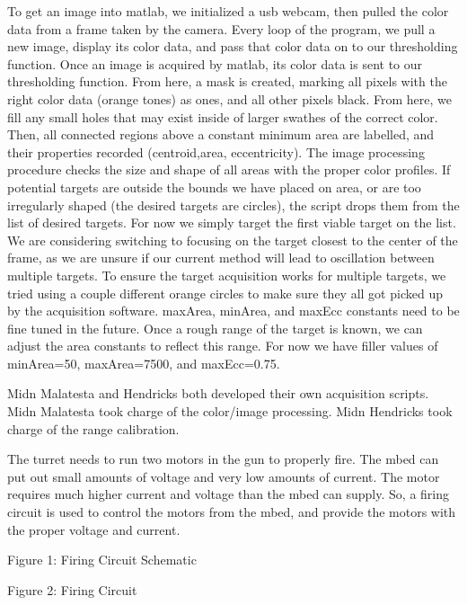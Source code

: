 To get an image into matlab, we initialized a usb webcam, then pulled the color data from a frame taken by the camera. Every loop of the program, we pull a new image, display its color data, and pass that color data on to our thresholding function.
Once an image is acquired by matlab, its color data is sent to our thresholding function. From here, a mask is created, marking all pixels with the right color data (orange tones) as ones, and all other pixels black. From here, we fill any small holes that may exist inside of larger swathes of the correct color. Then, all connected regions above a constant minimum area are labelled, and their properties recorded (centroid,area, eccentricity). 
The image processing procedure checks the size and shape of all areas with the proper color profiles. If potential targets are outside the bounds we have placed on area, or are too irregularly shaped (the desired targets are circles), the script drops them from the list of desired targets. For now we simply target the first viable target on the list. We are considering switching to focusing on the target closest to the center of the frame, as we are unsure if our current method will lead to oscillation between multiple targets.
To ensure the target acquisition works for multiple targets, we tried using a couple different orange circles to make sure they all got picked up by the acquisition software. 
maxArea, minArea, and maxEcc constants need to be fine tuned in the future. Once a rough range of the target is known, we can adjust the area constants to reflect this range. For now we have filler values of minArea=50, maxArea=7500, and maxEcc=0.75.

Midn Malatesta and Hendricks both developed their own acquisition scripts. Midn Malatesta took charge of the color/image processing. Midn Hendricks took charge of the range calibration. 





The turret needs to run two motors in the gun to properly fire. The mbed can put out small amounts of voltage and very low amounts of current. The motor requires much higher current and voltage than the mbed can supply. So, a firing circuit is used to control the  motors from the mbed, and provide the motors with the proper voltage and current.

Figure 1: Firing Circuit Schematic

Figure 2: Firing Circuit

